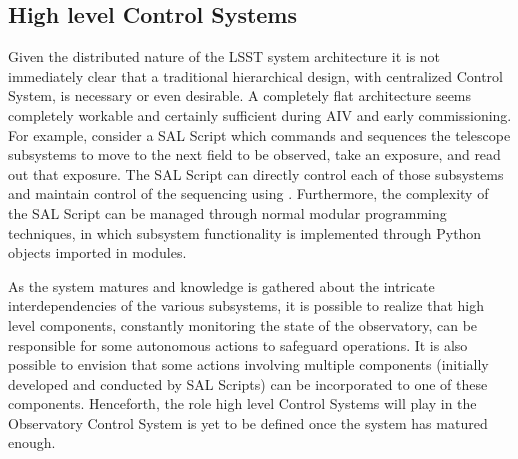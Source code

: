 \subsection{High level Control Systems} \label{sect:ocs}
Given the distributed nature of the LSST system architecture it is not immediately clear that a traditional hierarchical design, with centralized Control System, is necessary or even desirable. A completely flat architecture seems completely workable and certainly sufficient during AIV and early commissioning. For example, consider a SAL Script which commands and sequences the telescope subsystems to move to the next field to be observed, take an exposure, and read out that exposure. The SAL Script can directly control each of those subsystems and maintain control of the sequencing using \asyncio. Furthermore, the complexity of the SAL Script can be managed through normal modular programming techniques, in which subsystem functionality is implemented through Python objects imported in modules.

As the system matures and knowledge is gathered about the intricate interdependencies of the various subsystems, it is possible to realize  that high level components, constantly monitoring the state of the observatory, can be responsible for some autonomous actions to safeguard operations. It is also possible to envision that some actions involving multiple components (initially developed and conducted by SAL Scripts) can be incorporated to one of these components. Henceforth, the role high level Control Systems will play in the Observatory Control System is yet to be defined once the system has matured enough.




